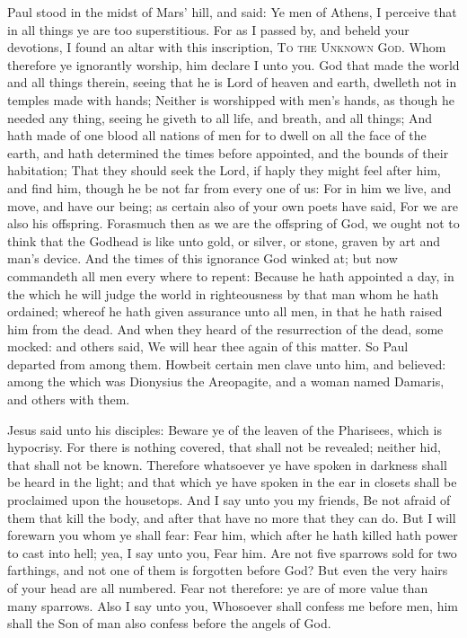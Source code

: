  Paul stood in the midst of Mars' hill, and said: Ye men of Athens, I perceive that in all things ye are too superstitious. For as I passed by, and beheld your devotions, I found an altar with this inscription, \textsc{To the Unknown God}. Whom therefore ye ignorantly worship, him declare I unto you. God that made the world and all things therein, seeing that he is Lord of heaven and earth, dwelleth not in temples made with hands; Neither is worshipped with men's hands, as though he needed any thing, seeing he giveth to all life, and breath, and all things; And hath made of one blood all nations of men for to dwell on all the face of the earth, and hath determined the times before appointed, and the bounds of their habitation; That they should seek the Lord, if haply they might feel after him, and find him, though he be not far from every one of us: For in him we live, and move, and have our being; as certain also of your own poets have said, For we are also his offspring. Forasmuch then as we are the offspring of God, we ought not to think that the Godhead is like unto gold, or silver, or stone, graven by art and man's device. And the times of this ignorance God winked at; but now commandeth all men every where to repent: Because he hath appointed a day, in the which he will judge the world in righteousness by that man whom he hath ordained; whereof he hath given assurance unto all men, in that he hath raised him from the dead. And when they heard of the resurrection of the dead, some mocked: and others said, We will hear thee again of this matter. So Paul departed from among them. Howbeit certain men clave unto him, and believed: among the which was Dionysius the Areopagite, and a woman named Damaris, and others with them.


 Jesus said unto his disciples: Beware ye of the leaven of the Pharisees, which is hypocrisy. For there is nothing covered, that shall not be revealed; neither hid, that shall not be known. Therefore whatsoever ye have spoken in darkness shall be heard in the light; and that which ye have spoken in the ear in closets shall be proclaimed upon the housetops. And I say unto you my friends, Be not afraid of them that kill the body, and after that have no more that they can do. But I will forewarn you whom ye shall fear: Fear him, which after he hath killed hath power to cast into hell; yea, I say unto you, Fear him. Are not five sparrows sold for two farthings, and not one of them is forgotten before God? But even the very hairs of your head are all numbered. Fear not therefore: ye are of more value than many sparrows. Also I say unto you, Whosoever shall confess me before men, him shall the Son of man also confess before the angels of God.

